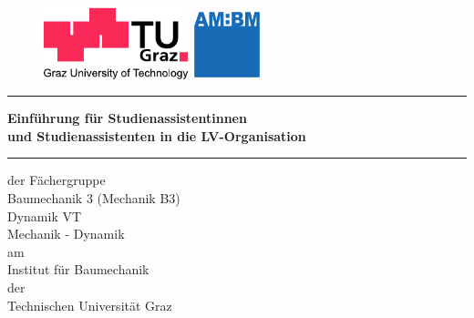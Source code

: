 %
%
\begin{titlepage}
        \begin{figure}[htbp]
        \hspace{.05\linewidth}
            \begin{minipage}[b]{.6\linewidth}
                \includegraphics[width=4.2cm]{coverPics/logo_lang_V8.pdf}
            \end{minipage}
            \hspace{.2\linewidth}
        \begin{minipage}[b]{.2\linewidth}
                \includegraphics[width=2cm]{coverPics/AM_BM.pdf}
        \end{minipage}
        \end{figure}

        \vspace*{3mm}
    \hrule

    \fontsize{16pt}{24pt}\selectfont


\begin{center}
    \vspace{30mm}
        \textsf{\textbf{Einf\"{u}hrung f\"{u}r Studienassistentinnen \\
          und Studienassistenten in die LV-Organisation}}
    \normalfont

    \vspace{10mm}
        \hrule
    \vspace{10mm}
    \normalsize{der F\"{a}chergruppe}\\
    \vspace{5mm}
    \Large{Baumechanik 3 (Mechanik B3)}\\
    \Large{Dynamik VT}\\
    \Large{Mechanik - Dynamik}\\ 
    \vspace{5mm}
    \normalsize{am}\\
    \vspace{5mm}
    \Large{Institut f\"{u}r Baumechanik \\ der 
          \\ Technischen Universit\"{a}t Graz} \\


\end{center}
\end{titlepage}
